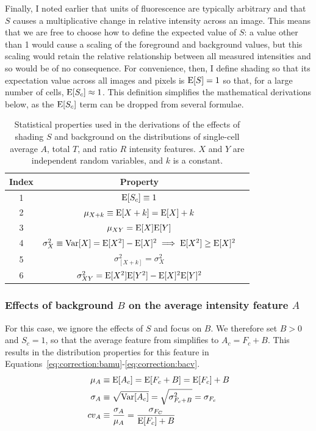 Finally, I noted earlier that units of fluorescence are typically arbitrary
and that $S$ causes a multiplicative change in relative intensity across
an image. This means
that we are free to choose how to define the expected value of $S$: a
value other than 1 would cause a scaling of the foreground and
background values, but this scaling would retain the relative relationship between
all measured intensities and so would be of no consequence.
For convenience, then, I define shading so that
its expectation value across all images and pixels is $\mathrm{E}[S]=1$
so that, for a large number of cells, $\mathrm{E}[S_c]\approx 1$. This definition simplifies
the mathematical derivations below, as the $\mathrm{E}[S_c]$ term can be dropped
from several formulae.


    \begin{table}[!bt]
    \centering
    \caption[Table of useful statistical properties.]{
    Statistical properties used in the derivations of the effects
    of shading $S$ and background on the distributions of single-cell
    average $A$, total $T$, and ratio $R$ intensity features. $X$ and $Y$ are independent
    random variables, and $k$ is a constant.}
    \label{table:imaging:properties}
    \begin{tabular}{ccl}
    \hline
    Index & Property \\ \hline
    1 & $\mathrm{E}[S_c] \equiv 1$  \\
    2 & $\mu_{X+k} \equiv \mathrm{E}[X+k] = \mathrm{E}[X]+k$ \\
    3 & $\mu_{XY} = \mathrm{E}[X]\mathrm{E}[Y]$ \\
    4 & $\sigma^2_X \equiv \mathrm{Var}[X] = 
        \mathrm{E}[X^2]-\mathrm{E}[X]^2 \implies \mathrm{E}[X^2]\geq \mathrm{E}[X]^2$\\
    5 & $\sigma^2_{[X+k]} = \sigma^2_X$ \\
    6 & $\sigma^2_{XY} = \mathrm{E}[X^2]\mathrm{E}[Y^2]-\mathrm{E}[X]^2 \mathrm{E}[Y]^2$ \\
    \hline
    \end{tabular}
    \end{table}



\subsubsection{Effects of background $B$ on the average intensity feature $A$}


For this case, we ignore the effects of $S$ and focus on $B$. 
We therefore set $B>0$ and $S_c=1$, so that the average feature 
from  simplifies to $A_c=F_c+B$.
This results in the distribution properties for this feature in 
Equations~\ref{eq:correction:bamu}\nobreakdash-\ref{eq:correction:bacv}.
    \begin{align}
    \mu_A    & \equiv \mathrm{E}[A_c] = \mathrm{E}[F_c+B] = \mathrm{E}[F_c] + B  \label{eq:correction:bamu}\\
    \sigma_A & \equiv \sqrt{\mathrm{Var}[A_c]} = \sqrt{\sigma^2_{F_c+B}} = \sigma_{F_c} \label{eq:correction:basd}\\
    cv_A     & \equiv \frac{\sigma_A}{\mu_A} = \frac{\sigma_{F_C}}{\mathrm{E}[F_c]+B} \label{eq:correction:bacv}
    \end{align}



